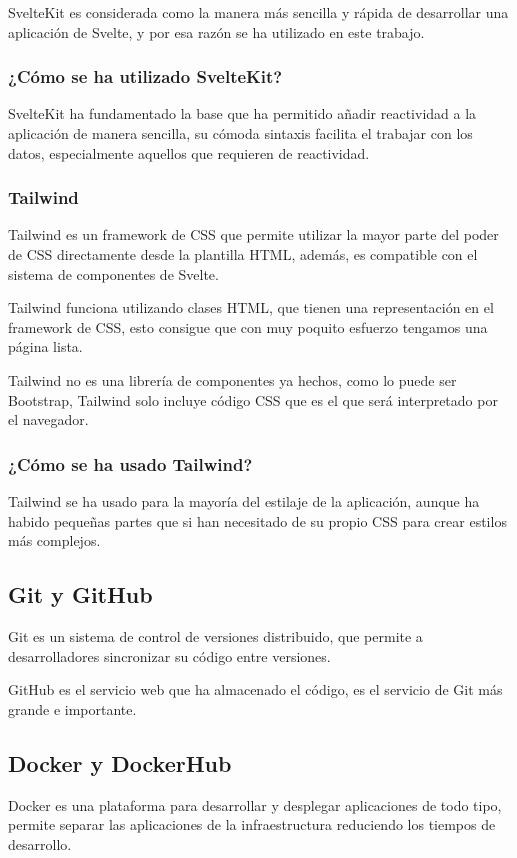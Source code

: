 SvelteKit es considerada como la manera más sencilla y rápida de desarrollar una aplicación de Svelte, y por esa razón se ha utilizado en este trabajo.

\subsubsection{¿Cómo se ha utilizado SvelteKit?}
SvelteKit ha fundamentado la base que ha permitido añadir reactividad a la aplicación de manera sencilla, su cómoda sintaxis facilita el trabajar con los datos, especialmente aquellos que requieren de reactividad.

\subsubsection{Tailwind}
Tailwind \cite{tailwind_docs} es un framework de CSS que permite utilizar la mayor parte del poder de CSS directamente desde la plantilla HTML, además, es compatible con el sistema de componentes de Svelte.

Tailwind funciona utilizando clases HTML, que tienen una representación en el framework de CSS, esto consigue que con muy poquito esfuerzo tengamos una página lista.

Tailwind no es una librería de componentes ya hechos, como lo puede ser Bootstrap, Tailwind solo incluye código CSS que es el que será interpretado por el navegador.

\subsubsection{¿Cómo se ha usado Tailwind?}
Tailwind se ha usado para la mayoría del estilaje de la aplicación, aunque ha habido pequeñas partes que si han necesitado de su propio CSS para crear estilos más complejos.

\subsection{Git y GitHub}
Git es un sistema de control de versiones distribuido, que permite a desarrolladores sincronizar su código entre versiones.

GitHub es el servicio web que ha almacenado el código, es el servicio de Git más grande e importante.

\subsection{Docker y DockerHub}
Docker es una plataforma para desarrollar y desplegar aplicaciones de todo tipo, permite separar las aplicaciones de la infraestructura reduciendo los tiempos de desarrollo.

